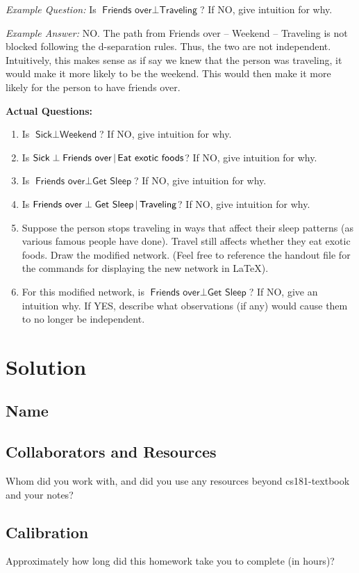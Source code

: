 \documentclass[submit]{harvardml}
\newcommand{\attr}[1]{\textsf{#1}}
\begin{document}
\begin{problem}
\textit{Example Question:} Is $\attr{Friends over} \perp \attr{Traveling}$? If NO, give intuition for why.

\textit{Example Answer:} NO. The path from Friends over -- Weekend -- Traveling is not blocked following the d-separation rules. Thus, the two are not independent. Intuitively, this makes sense as if say we knew that the person was traveling, it would make it more likely to be the weekend. This would then make it more likely for the person to have friends over.

\textbf{Actual Questions:}

\begin{enumerate}
\item Is $\attr{Sick} \perp \attr{Weekend}$?
  If NO, give intuition for why.


\item Is $\attr{Sick} \perp \attr{Friends over}\given \attr{Eat exotic
  foods}$? If NO, give intuition for why.


\item Is $\attr{Friends over} \perp \attr{Get Sleep}$? If NO, give
  intuition for why.

\item Is $\attr{Friends over} \perp \attr{Get Sleep} \given
  \attr{Traveling}$? If NO, give intuition for why.

\item Suppose the person stops traveling in ways that affect their
  sleep patterns (as various famous people have done).  Travel still
  affects whether they eat exotic foods.  Draw the modified network. (Feel free to reference the handout file for the commands for displaying the new network in \LaTeX).

\item For this modified network, is $\attr{Friends over} \perp
  \attr{Get Sleep}$? If NO, give an intuition why.  If YES,
  describe what observations (if any) would cause them to no longer be
  independent.

\end{enumerate}
\end{problem}


\section*{Solution}


\newpage
\subsection*{Name}

\subsection*{Collaborators and Resources}
Whom did you work with, and did you use any resources beyond cs181-textbook and your notes?

\subsection*{Calibration}
Approximately how long did this homework take you to complete (in hours)? 
\end{document}

